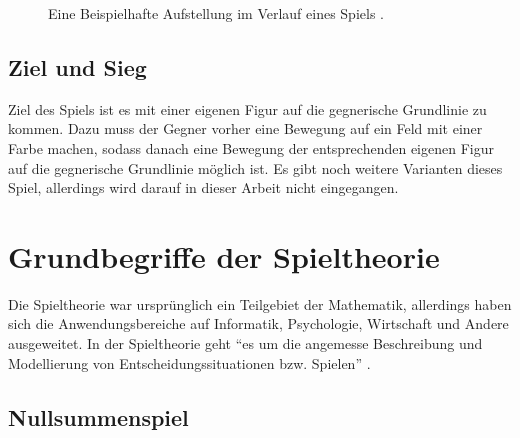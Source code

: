\documentclass[
	12pt,
	halfparskip,
	a4paper,
	abstract,
	bibliography=totoc,
	liststotoc
]{scrreprt}
\begin{document}
\begin{figure}[htb]
\begin{center}
\end{center}
\caption{Eine Beispielhafte Aufstellung im Verlauf eines Spiels
\citep{kamisado.com}.}
\label{fig:mittelspiel}
\end{figure}

\section{Ziel und Sieg}

Ziel des Spiels ist es mit einer eigenen Figur auf die gegnerische Grundlinie zu kommen. Dazu muss der Gegner vorher eine Bewegung auf ein Feld mit einer Farbe machen, sodass danach eine Bewegung der entsprechenden eigenen Figur auf die gegnerische Grundlinie möglich ist. Es gibt noch weitere Varianten dieses Spiel, allerdings wird darauf in dieser Arbeit nicht eingegangen. \citep{huch}

\chapter{Grundbegriffe der Spieltheorie}

Die Spieltheorie war ursprünglich ein Teilgebiet der Mathematik, allerdings haben sich die Anwendungsbereiche auf Informatik, Psychologie, Wirtschaft und Andere ausgeweitet. In der Spieltheorie geht “es um die angemesse Beschreibung und Modellierung von Entscheidungssituationen bzw. Spielen” \citep[S. 2]{wiese}.

\section{Nullsummenspiel}
\end{document}

